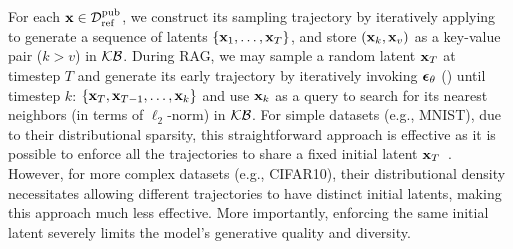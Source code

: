 For each ${\mathbf{x}} \in {\mathcal{D}}^\mathrm{pub}_\mathrm{ref}$, we construct its sampling trajectory by iteratively applying  to generate a sequence of latents $\{{\mathbf{x}}_1, \ldots, {\mathbf{x}}_T \}$, and store $({\mathbf{x}}_k, {\mathbf{x}}_v)$ as a key-value pair ($k > v$) in ${\mathcal{K}}{\mathcal{B}}$. During RAG, 
we may sample a random latent ${\mathbf{x}}_T$ at timestep $T$ and generate its  early trajectory by iteratively invoking $\bm{\epsilon}_\theta$ () until timestep $k$: $\{{\mathbf{x}}_T, {\mathbf{x}}_{T-1}, \ldots, {\mathbf{x}}_k\}$ and use ${\mathbf{x}}_k$ as a query to search for its nearest neighbors (in terms of $\ell_2$-norm) in ${\mathcal{K}}{\mathcal{B}}$.
For simple datasets (e.g., MNIST), due to their distributional sparsity, this straightforward approach is effective as it is possible to enforce all the trajectories to share a fixed initial latent  ${\mathbf{x}}_T$~\citep{zhang2023redi}. However, for more complex datasets (e.g., CIFAR10), their distributional density necessitates allowing different trajectories to have distinct 
initial latents, making this approach much less effective. More importantly, enforcing the same initial latent severely limits the model's generative quality and diversity.  %




